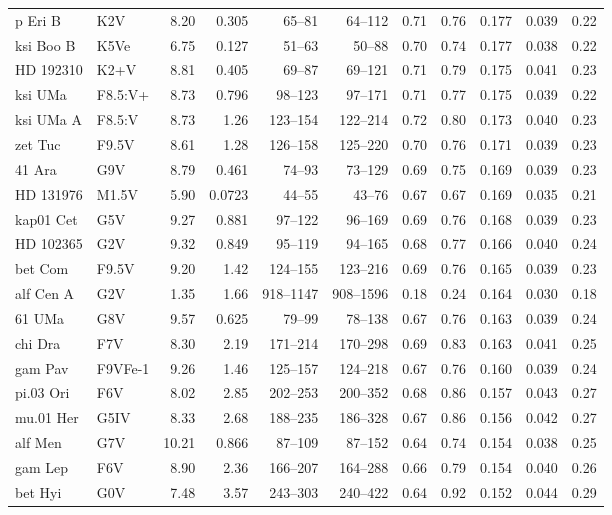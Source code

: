 \documentclass[11pt,a4paper]{article}
\begin{document}
{\begin{longtable}{llrrrrrrrrr}
p Eri B & K2V & 8.20 & 0.305 & 65--81 & 64--112 & 0.71 & 0.76 & 0.177 & 0.039 & 0.22 \\
ksi Boo B & K5Ve & 6.75 & 0.127 & 51--63 & 50--88 & 0.70 & 0.74 & 0.177 & 0.038 & 0.22 \\
HD 192310 & K2+V & 8.81 & 0.405 & 69--87 & 69--121 & 0.71 & 0.79 & 0.175 & 0.041 & 0.23 \\
ksi UMa & F8.5:V+ & 8.73 & 0.796 & 98--123 & 97--171 & 0.71 & 0.77 & 0.175 & 0.039 & 0.22 \\
ksi UMa A & F8.5:V & 8.73 & 1.26 & 123--154 & 122--214 & 0.72 & 0.80 & 0.173 & 0.040 & 0.23 \\
zet Tuc & F9.5V & 8.61 & 1.28 & 126--158 & 125--220 & 0.70 & 0.76 & 0.171 & 0.039 & 0.23 \\
41 Ara & G9V & 8.79 & 0.461 & 74--93 & 73--129 & 0.69 & 0.75 & 0.169 & 0.039 & 0.23 \\
HD 131976 & M1.5V & 5.90 & 0.0723 & 44--55 & 43--76 & 0.67 & 0.67 & 0.169 & 0.035 & 0.21 \\
kap01 Cet & G5V & 9.27 & 0.881 & 97--122 & 96--169 & 0.69 & 0.76 & 0.168 & 0.039 & 0.23 \\
HD 102365 & G2V & 9.32 & 0.849 & 95--119 & 94--165 & 0.68 & 0.77 & 0.166 & 0.040 & 0.24 \\
bet Com & F9.5V & 9.20 & 1.42 & 124--155 & 123--216 & 0.69 & 0.76 & 0.165 & 0.039 & 0.23 \\
alf Cen A & G2V & 1.35 & 1.66 & 918--1147 & 908--1596 & 0.18 & 0.24 & 0.164 & 0.030 & 0.18 \\
61 UMa & G8V & 9.57 & 0.625 & 79--99 & 78--138 & 0.67 & 0.76 & 0.163 & 0.039 & 0.24 \\
chi Dra & F7V & 8.30 & 2.19 & 171--214 & 170--298 & 0.69 & 0.83 & 0.163 & 0.041 & 0.25 \\
gam Pav & F9VFe-1 & 9.26 & 1.46 & 125--157 & 124--218 & 0.67 & 0.76 & 0.160 & 0.039 & 0.24 \\
pi.03 Ori & F6V & 8.02 & 2.85 & 202--253 & 200--352 & 0.68 & 0.86 & 0.157 & 0.043 & 0.27 \\
mu.01 Her & G5IV & 8.33 & 2.68 & 188--235 & 186--328 & 0.67 & 0.86 & 0.156 & 0.042 & 0.27 \\
alf Men & G7V & 10.21 & 0.866 & 87--109 & 87--152 & 0.64 & 0.74 & 0.154 & 0.038 & 0.25 \\
gam Lep & F6V & 8.90 & 2.36 & 166--207 & 164--288 & 0.66 & 0.79 & 0.154 & 0.040 & 0.26 \\
bet Hyi & G0V & 7.48 & 3.57 & 243--303 & 240--422 & 0.64 & 0.92 & 0.152 & 0.044 & 0.29 \\

\end{longtable}}
\end{document}
